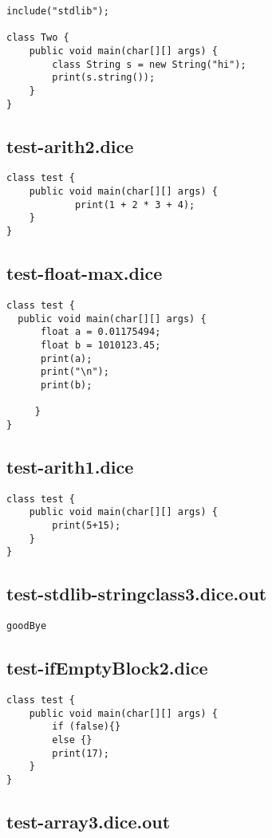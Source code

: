\begin{verbatim}
include("stdlib");

class Two {
	public void main(char[][] args) {
        class String s = new String("hi");
        print(s.string());
	}
}

\end{verbatim}\pagebreak\subsection{test-arith2.dice}
\begin{verbatim}
class test {
	public void main(char[][] args) {
			print(1 + 2 * 3 + 4);
	}
} 

\end{verbatim}\pagebreak\subsection{test-float-max.dice}
\begin{verbatim}
class test {
  public void main(char[][] args) {
      float a = 0.01175494;
      float b = 1010123.45;
      print(a);
      print("\n");
      print(b);

     }
}
\end{verbatim}\pagebreak\subsection{test-arith1.dice}
\begin{verbatim}
class test {
	public void main(char[][] args) {
		print(5+15);
	}
}
\end{verbatim}\pagebreak\subsection{test-stdlib-stringclass3.dice.out}
\begin{verbatim}
goodBye
\end{verbatim}\pagebreak\subsection{test-ifEmptyBlock2.dice}
\begin{verbatim}
class test {
	public void main(char[][] args) {
  		if (false){}
  		else {}
  		print(17);
	}
}

\end{verbatim}\pagebreak\subsection{test-array3.dice.out}
